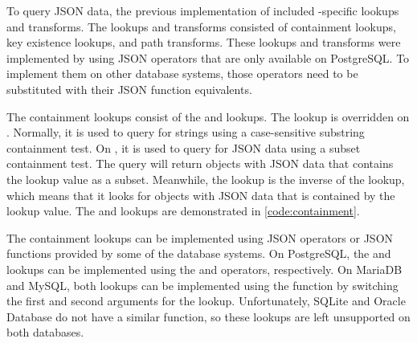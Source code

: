 To query JSON data, the previous implementation of  included
-specific lookups and transforms. The lookups and transforms
consisted of containment lookups, key existence lookups, and path transforms.
These lookups and transforms were implemented by using JSON operators that are
only available on PostgreSQL. To implement them on other database systems,
those operators need to be substituted with their JSON function equivalents.

\noindent
\begin{minipage}{\linewidth}

\end{minipage}

The containment lookups consist of the  and 
lookups. The  lookup is overridden on .
Normally, it is used to query for strings using a case-sensitive substring
containment test. On , it is used to query for JSON data using
a subset containment test. The query will return objects with JSON data that
contains the lookup value as a subset. Meanwhile, the 
lookup is the inverse of the  lookup, which means that it looks
for objects with JSON data that is contained by the lookup value. The
 and  lookups are demonstrated in
\autoref{code:containment}.

The containment lookups can be implemented using JSON operators or JSON
functions provided by some of the database systems. On PostgreSQL, the
 and  lookups can be implemented using the
 and  operators, respectively. On MariaDB and MySQL, both
lookups can be implemented using the  function by
switching the first and second arguments for the  lookup.
Unfortunately, SQLite and Oracle Database do not have a similar function, so
these lookups are left unsupported on both databases.



